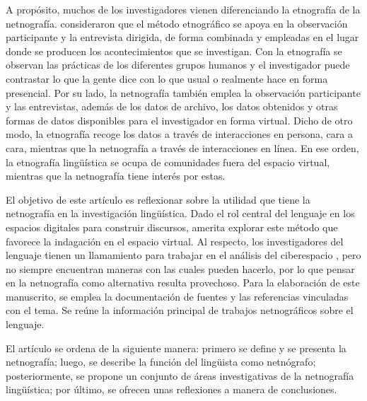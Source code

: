 A propósito, muchos de los investigadores vienen diferenciando la
etnografía de la netnografía. \textcite{hammersley1983ethnography} consideraron
que el método etnográfico se apoya en la observación participante y la
entrevista dirigida, de forma combinada y empleadas en el lugar donde se
producen los acontecimientos que se investigan. Con la etnografía se
observan las prácticas de los diferentes grupos humanos y el
investigador puede contrastar lo que la gente dice con lo que usual o
realmente hace en forma presencial. Por su lado, la netnografía también
emplea la observación participante y las entrevistas, además de los
datos de archivo, los datos obtenidos y otras formas de datos
disponibles para el investigador \cite{kulavuz-onal2015} en forma virtual.
Dicho de otro modo, la etnografía recoge los datos a través de
interacciones en persona, cara a cara, mientras que la netnografía a
través de interacciones en línea. En ese orden, la etnografía
lingüística se ocupa de comunidades fuera del espacio virtual, mientras
que la netnografía tiene interés por estas.

El objetivo de este artículo es reflexionar sobre la utilidad que tiene
la netnografía en la investigación lingüística. Dado el rol central del
lenguaje en los espacios digitales para construir discursos, amerita
explorar este método que favorece la indagación en el espacio virtual.
Al respecto, los investigadores del lenguaje tienen un llamamiento para
trabajar en el análisis del ciberespacio \cite{maine2021}, pero
no siempre encuentran maneras con las cuales pueden hacerlo, por lo que
pensar en la netnografía como alternativa resulta provechoso. Para la
elaboración de este manuscrito, se emplea la documentación de fuentes y
las referencias vinculadas con el tema. Se reúne la información
principal de trabajos netnográficos sobre el lenguaje.

El artículo se ordena de la siguiente manera: primero se define y se
presenta la netnografía; luego, se describe la función del lingüista
como netnógrafo; posteriormente, se propone un conjunto de áreas
investigativas de la netnografía lingüística; por último, se ofrecen
unas reflexiones a manera de conclusiones.
